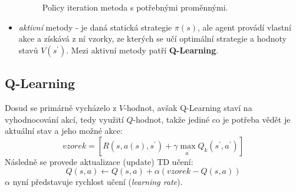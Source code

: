 \begin{itemize}
\begin{figure}[!htbp]
\begin{center}
	\caption{Policy iteration metoda s potřebnými proměnnými.}
	\label{img:policyeval}
\end{center}
\end{figure}

\item \textit{aktivní} metody - je daná statická strategie $\pi(s)$, ale agent provádí vlastní akce a získává z ní vzorky, ze kterých se učí optimální strategie a hodnoty stavů $V(s^\prime)$. Mezi aktivní metody patří \textbf{Q-Learning}.
\end{itemize}

\subsection{Q-Learning}
Dosud se primárně vycházelo z $V$-hodnot, avšak Q-Learning staví na vyhodnocování akcí, tedy využití $Q$-hodnot, takže jediné co je potřeba vědět je aktuální stav a jeho možné akce:
\begin{displaymath}
vzorek = \left [ R(s,a(s),s^\prime)+\gamma \max_{a^\prime}Q_{k}(s^\prime,a^\prime) \right]
\end{displaymath}
Následně se provede aktualizace (update) TD učení:
\begin{displaymath}
 Q(s,a) \leftarrow  Q(s,a) + \alpha(vzorek - Q(s,a))
\end{displaymath}
$\alpha$ nyní představuje rychlost učení (\textit{learning rate}).


